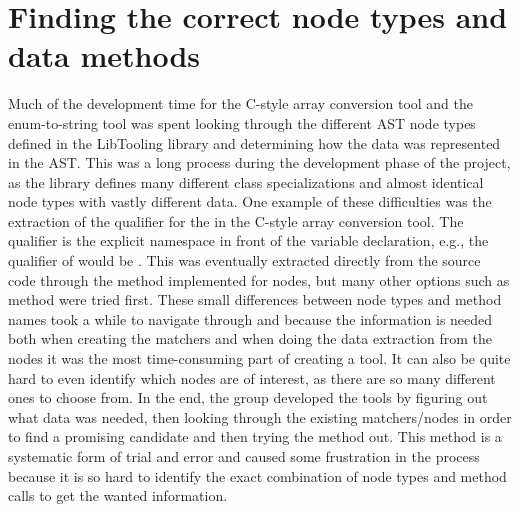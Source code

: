
\section{Finding the correct node types and data methods}

Much of the development time for the C-style array conversion tool and the enum-to-string tool was spent looking through the different AST node types defined in the LibTooling library and determining how the data was represented in the AST.
This was a long process during the development phase of the project, as the library defines many different class specializations and almost identical node types with vastly different data.
One example of these difficulties was the extraction of the qualifier for the  in the C-style array conversion tool.
The qualifier is the explicit namespace in front of the variable declaration, e.g., the qualifier of  would be .
This was eventually extracted directly from the source code through the   method implemented for  nodes, but many other options such as  method were tried first.
These small differences between node types and method names took a while to navigate through and because the information is needed both when creating the matchers and when doing the data extraction from the nodes it was the most time-consuming part of creating a tool.
It can also be quite hard to even identify which nodes are of interest, as there are so many different ones to choose from.
In the end, the group developed the tools by figuring out what data was needed, then looking through the existing matchers/nodes in order to find a promising candidate and then trying the method out.
This method is a systematic form of trial and error and caused some frustration in the process because it is so hard to identify the exact combination of node types and method calls to get the wanted information.